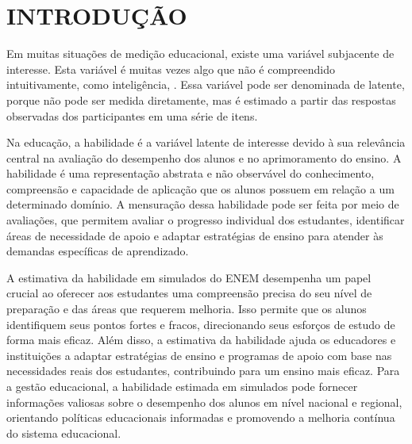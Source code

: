 \chapter{INTRODUÇÃO}

Em muitas situações de medição educacional, existe uma variável subjacente de interesse. Esta variável é muitas vezes algo que não é compreendido intuitivamente, como inteligência, \cite{baker2001}. Essa variável pode ser denominada de latente, porque não pode ser medida diretamente, mas é estimado a partir das respostas observadas dos participantes em uma série de itens. \cite{pasquali2003}

Na educação, a habilidade é a variável latente de interesse devido à sua relevância central na avaliação do desempenho dos alunos e no aprimoramento do ensino. A habilidade é uma representação abstrata e não observável do conhecimento, compreensão e capacidade de aplicação que os alunos possuem em relação a um determinado domínio. A mensuração dessa habilidade pode ser feita por meio de avaliações, que permitem avaliar o progresso individual dos estudantes, identificar áreas de necessidade de apoio e adaptar estratégias de ensino para atender às demandas específicas de aprendizado.
\begin{comment}
	A avaliação desempenha um papel de extrema importância no contexto educacional, conforme enfatizado por Gimeno (1994) ao afirmar que ``a função fundamental que a avaliação deve cumprir no processo didático é a de informar ou conscientizar os professores acerca de como caminham os acontecimentos em sua turma, os processos de aprendizagem que desencadeiam em cada um de seus alunos, durante o mesmo.'' Essa citação destaca que a avaliação vai além de simplesmente medir resultados; ela serve como um meio essencial para os educadores compreenderem o desenvolvimento de suas turmas. Através da avaliação, os professores podem identificar as necessidades específicas de cada estudante, adaptar suas abordagens pedagógicas e fornecer suporte personalizado, criando um ambiente educacional que promove o crescimento tanto individual quanto coletivo.
\end{comment}


A estimativa da habilidade em simulados do ENEM desempenha um papel crucial ao oferecer aos estudantes uma compreensão precisa do seu nível de preparação e das áreas que requerem melhoria. Isso permite que os alunos identifiquem seus pontos fortes e fracos, direcionando seus esforços de estudo de forma mais eficaz. Além disso, a estimativa da habilidade ajuda os educadores e instituições a adaptar estratégias de ensino e programas de apoio com base nas necessidades reais dos estudantes, contribuindo para um ensino mais eficaz. Para a gestão educacional, a habilidade estimada em simulados pode fornecer informações valiosas sobre o desempenho dos alunos em nível nacional e regional, orientando políticas educacionais informadas e promovendo a melhoria contínua do sistema educacional. 

